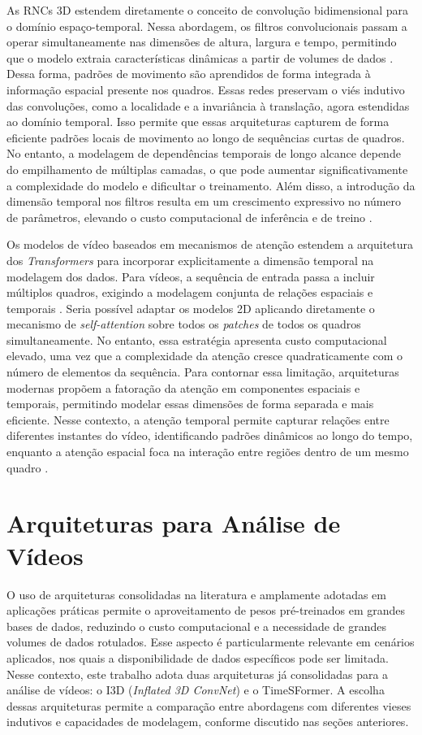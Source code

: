 \documentclass[12pt, %
openright, 
oneside, %
a4paper,    %
brazil]{facom-ufu-abntex2}
\begin{document}
As RNCs 3D estendem diretamente o conceito de convolução bidimensional para o domínio espaço-temporal. Nessa abordagem, os filtros convolucionais passam a operar simultaneamente nas dimensões de altura, largura e tempo, permitindo que o modelo extraia características dinâmicas a partir de volumes de dados \cite{video_conv}. Dessa forma, padrões de movimento são aprendidos de forma integrada à informação espacial presente nos quadros. Essas redes preservam o viés indutivo das convoluções, como a localidade e a invariância à translação, agora estendidas ao domínio temporal. Isso permite que essas arquiteturas capturem de forma eficiente padrões locais de movimento ao longo de sequências curtas de quadros. No entanto, a modelagem de dependências temporais de longo alcance depende do empilhamento de múltiplas camadas, o que pode aumentar significativamente a complexidade do modelo e dificultar o treinamento. Além disso, a introdução da dimensão temporal nos filtros resulta em um crescimento expressivo no número de parâmetros, elevando o custo computacional de inferência e de treino \cite{rnc_3d}.

Os modelos de vídeo baseados em mecanismos de atenção estendem a arquitetura dos \textit{Transformers} para incorporar explicitamente a dimensão temporal na modelagem dos dados. Para vídeos, a sequência de entrada passa a incluir múltiplos quadros, exigindo a modelagem conjunta de relações espaciais e temporais \cite{timesformer}. Seria possível adaptar os modelos 2D aplicando diretamente o mecanismo de \textit{self-attention} sobre todos os \textit{patches} de todos os quadros simultaneamente. No entanto, essa estratégia apresenta custo computacional elevado, uma vez que a complexidade da atenção cresce quadraticamente com o número de elementos da sequência. Para contornar essa limitação, arquiteturas modernas propõem a fatoração da atenção em componentes espaciais e temporais, permitindo modelar essas dimensões de forma separada e mais eficiente. Nesse contexto, a atenção temporal permite capturar relações entre diferentes instantes do vídeo, identificando padrões dinâmicos ao longo do tempo, enquanto a atenção espacial foca na interação entre regiões dentro de um mesmo quadro \cite{vivit}. 

\section[Arquiteturas para Análise de Vídeos]{Arquiteturas para Análise de Vídeos}

 O uso de arquiteturas consolidadas na literatura e amplamente adotadas em aplicações práticas permite o aproveitamento de pesos pré-treinados em grandes bases de dados, reduzindo o custo computacional e a necessidade de grandes volumes de dados rotulados. Esse aspecto é particularmente relevante em cenários aplicados, nos quais a disponibilidade de dados específicos pode ser limitada. Nesse contexto, este trabalho adota duas arquiteturas já consolidadas para a análise de vídeos: o I3D (\textit{Inflated 3D ConvNet}) e o TimeSFormer. A escolha dessas arquiteturas permite a comparação entre abordagens com diferentes vieses indutivos e capacidades de modelagem, conforme discutido nas seções anteriores.
\end{document}
